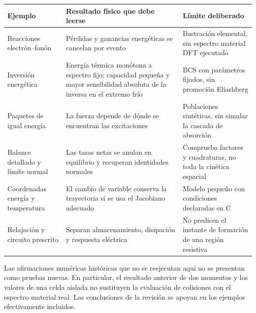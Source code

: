 \documentclass[
  spanish,
  10pt,
  a4paper,
]{article}
\newcounter{none} %
\begin{document}
{\def\LTcaptype{none} %
\begin{longtable}[]{@{}
  >{\raggedright\arraybackslash}p{}
  >{\raggedright\arraybackslash}p{}
  >{\raggedright\arraybackslash}p{}@{}}
\toprule\noalign{}
\begin{minipage}[b]{\linewidth}\raggedright
Ejemplo
\end{minipage} & \begin{minipage}[b]{\linewidth}\raggedright
Resultado físico que debe leerse
\end{minipage} & \begin{minipage}[b]{\linewidth}\raggedright
Límite deliberado
\end{minipage} \\
\midrule\noalign{}
\endhead
\bottomrule\noalign{}
\endlastfoot
Reacciones electrón--fonón & Pérdidas y ganancias energéticas se
cancelan por evento & Ilustración elemental, sin espectro material DFT
ejecutado \\
Inversión energética & Energía térmica monótona a espectro fijo;
capacidad pequeña y mayor sensibilidad absoluta de la inversa en el
extremo frío & BCS con parámetros fijados, sin promoción Eliashberg \\
Paquetes de igual energía & La fuerza depende de dónde se encuentran las
excitaciones & Poblaciones sintéticas, sin simular la cascada de
absorción \\
Balance detallado y límite normal & Las tasas netas se anulan en
equilibrio y recuperan identidades normales & Comprueba factores y
cuadraturas, no toda la cinética espacial \\
Coordenadas energía y temperatura & El cambio de variable conserva la
trayectoria si se usa el Jacobiano adecuado & Modelo pequeño con
condiciones declaradas en C \\
Relajación y circuito prescrito & Separan almacenamiento, disipación y
respuesta eléctrica & No predicen el instante de formación de una región
resistiva \\
\end{longtable}
}

Las afirmaciones numéricas históricas que no se reejecutan aquí no se
presentan como pruebas nuevas. En particular, el resultado anterior de
dos momentos y los valores de una celda aislada no sustituyen la
evaluación de colisiones con el espectro material real. Las conclusiones
de la revisión se apoyan en los ejemplos efectivamente incluidos.
\end{document}
